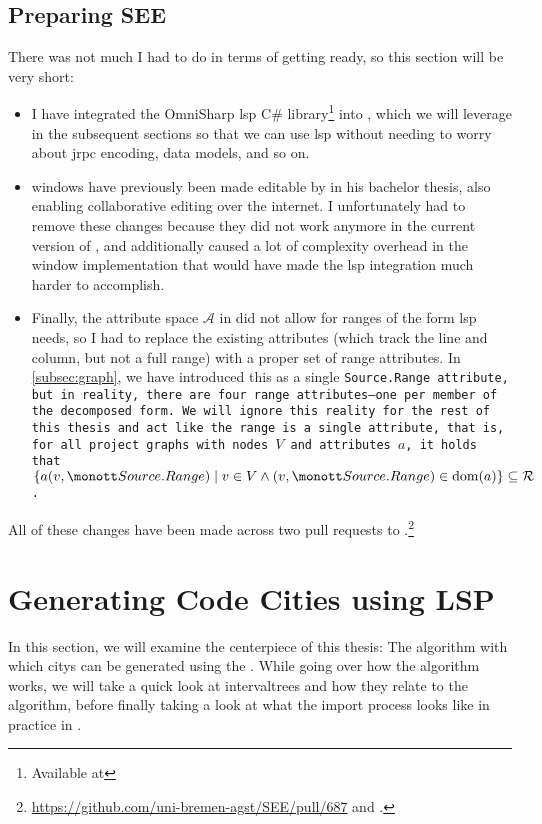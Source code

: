 \documentclass[../thesis]{subfiles}
\begin{document}
\subsection{Preparing SEE}
There was not much I had to do in terms of getting \SEE{} ready, so this section will be very short:
\begin{itemize}
	\item I have integrated the OmniSharp \gls{lsp} C\# library\footnote{
		      Available at 
	      } into \SEE{}, which we will leverage in the subsequent sections so that we can use \gls{lsp} without needing to worry about \gls{jrpc} encoding, data models, and so on.
	\item \Glspl{window} have previously been made editable by \textcite{moritz} in his bachelor thesis, also enabling collaborative editing over the internet.
	      I unfortunately had to remove these changes because they did not work anymore in the current version of \SEE{}, and additionally caused a lot of complexity overhead in the \gls{window} implementation that would have made the \gls{lsp} integration much harder to accomplish.
	\item Finally, the attribute space $\mathcal{A}$ in \SEE{} did not allow for \glspl{range} of the form \gls{lsp} needs, so I had to replace the existing attributes (which track the line and column, but not a full range) with a proper set of \gls{range} attributes.
	      In \cref{subsec:graph}, we have introduced this as a single \tt{Source.Range} attribute, but in reality, there are four \gls{range} attributes---one per member of the decomposed form.
	      We will ignore this reality for the rest of this thesis and act like the \gls{range} is a single attribute, that is, for all project graphs with nodes $V$ and attributes $a$, it holds that $\{a(v, \tt{Source.Range}) \mid v \in V \land (v, \tt{Source.Range}) \in \mathrm{dom}(a) \} \subseteq \mathcal{R}$.
\end{itemize}

All of these changes have been made across two pull requests to \SEE{}.\footnote{
	\url{https://github.com/uni-bremen-agst/SEE/pull/687} and .
}

\section{Generating Code Cities using LSP}\label{sec:generate}
In this section, we will examine the centerpiece of this thesis:
The algorithm with which \glspl{city} can be generated using the .
While going over how the algorithm works, we will take a quick look at \glspl{intervaltree} and how they relate to the algorithm, before finally taking a look at what the import process looks like in practice in \SEE{}.
\end{document}
